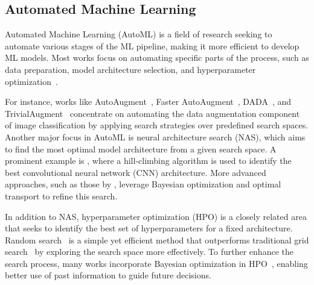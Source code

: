 \subsection{Automated Machine Learning}
Automated Machine Learning (AutoML) is a field of research seeking to automate various stages of the ML pipeline, making it more efficient to develop ML models. Most works focus on automating specific parts of the process, such as data preparation, model architecture selection, and hyperparameter optimization~\citep{he2021automl}.

For instance, works like AutoAugment~\citep{cubuk2019autoaugment}, Faster AutoAugment~\citep{hataya2019faster}, DADA~\citep{li2020dada}, and TrivialAugment~\citep{muller2021trivial} concentrate on automating the data augmentation component of image classification by applying search strategies over predefined search spaces. Another major focus in AutoML is neural architecture search (NAS), which aims to find the most optimal model architecture from a given search space. A prominent example is \citet{elsken2017nas}, where a hill-climbing algorithm is used to identify the best convolutional neural network (CNN) architecture. More advanced approaches, such as those by \citet{kandasamy2018bo}, leverage Bayesian optimization and optimal transport to refine this search.

In addition to NAS, hyperparameter optimization (HPO) is a closely related area that seeks to identify the best set of hyperparameters for a fixed architecture. Random search~\citep{bergstra2012hpo} is a simple yet efficient method that outperforms traditional grid search~\citep{bergstra2011hpo} by exploring the search space more effectively. To further enhance the search process, many works incorporate Bayesian optimization in HPO~\citep{snoek2012hpo, springenberg2016hpo, falkner2018hpo}, enabling better use of past information to guide future decisions.

